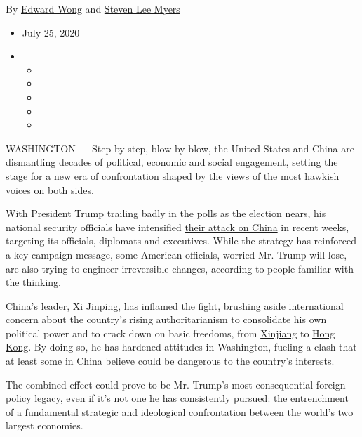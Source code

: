 By \href{https://www.nytimes3xbfgragh.onion/by/edward-wong}{Edward Wong}
and \href{https://www.nytimes3xbfgragh.onion/by/steven-lee-myers}{Steven
Lee Myers}

\begin{itemize}
\item
  July 25, 2020
\item
  \begin{itemize}
  \item
  \item
  \item
  \item
  \item
  \end{itemize}
\end{itemize}

WASHINGTON --- Step by step, blow by blow, the United States and China
are dismantling decades of political, economic and social engagement,
setting the stage for
\href{https://www.nytimes3xbfgragh.onion/2019/06/26/world/asia/united-states-china-conflict.html}{a
new era of confrontation} shaped by the views of
\href{https://www.nytimes3xbfgragh.onion/2020/07/14/world/asia/cold-war-china-us.html}{the
most hawkish voices} on both sides.

With President Trump
\href{https://www.nytimes3xbfgragh.onion/2020/07/24/upshot/biden-polls-demographics.html}{trailing
badly in the polls} as the election nears, his national security
officials have intensified
\href{https://www.nytimes3xbfgragh.onion/2020/03/22/us/politics/coronavirus-us-china.html}{their
attack on China} in recent weeks, targeting its officials, diplomats and
executives. While the strategy has reinforced a key campaign message,
some American officials, worried Mr. Trump will lose, are also trying to
engineer irreversible changes, according to people familiar with the
thinking.

China's leader, Xi Jinping, has inflamed the fight, brushing aside
international concern about the country's rising authoritarianism to
consolidate his own political power and to crack down on basic freedoms,
from
\href{https://www.nytimes3xbfgragh.onion/interactive/2019/11/16/world/asia/china-xinjiang-documents.html}{Xinjiang}
to
\href{https://www.nytimes3xbfgragh.onion/2020/06/29/world/asia/china-hong-kong-security-law-rules.html}{Hong
Kong}. By doing so, he has hardened attitudes in Washington, fueling a
clash that at least some in China believe could be dangerous to the
country's interests.

The combined effect could prove to be Mr. Trump's most consequential
foreign policy legacy,
\href{https://www.nytimes3xbfgragh.onion/2020/06/18/us/politics/trump-china-bolton.html}{even
if it's not one he has consistently pursued}: the entrenchment of a
fundamental strategic and ideological confrontation between the world's
two largest economies.

